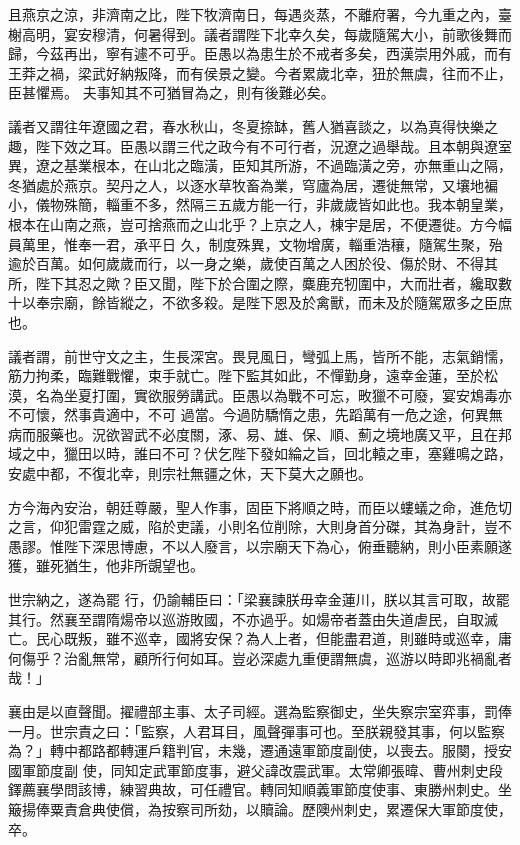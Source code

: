 \begin{pinyinscope}
 且燕京之涼，非濟南之比，陛下牧濟南日，每遇炎蒸，不離府署，今九重之內，臺榭高明，宴安穆清，何暑得到。議者謂陛下北幸久矣，每歲隨駕大小，前歌後舞而歸，今茲再出，寧有遽不可乎。臣愚以為患生於不戒者多矣，西漢崇用外戚，而有王莽之禍，梁武好納叛降，而有侯景之變。今者累歲北幸，狃於無虞，往而不止，臣甚懼焉。
 夫事知其不可猶冒為之，則有後難必矣。



 議者又謂往年遼國之君，春水秋山，冬夏捺缽，舊人猶喜談之，以為真得快樂之趣，陛下效之耳。臣愚以謂三代之政今有不可行者，況遼之過舉哉。且本朝與遼室異，遼之基業根本，在山北之臨潢，臣知其所游，不過臨潢之旁，亦無重山之隔，冬猶處於燕京。契丹之人，以逐水草牧畜為業，穹廬為居，遷徙無常，又壤地褊小，儀物殊簡，輜重不多，然隔三五歲方能一行，非歲歲皆如此也。我本朝皇業，根本在山南之燕，豈可捨燕而之山北乎？上京之人，棟宇是居，不便遷徙。方今幅員萬里，惟奉一君，承平日
 久，制度殊異，文物增廣，輜重浩穰，隨駕生聚，殆逾於百萬。如何歲歲而行，以一身之樂，歲使百萬之人困於役、傷於財、不得其所，陛下其忍之歟？臣又聞，陛下於合圍之際，麋鹿充牣圍中，大而壯者，纔取數十以奉宗廟，餘皆縱之，不欲多殺。是陛下恩及於禽獸，而未及於隨駕眾多之臣庶也。



 議者謂，前世守文之主，生長深宮。畏見風日，彎弧上馬，皆所不能，志氣銷懦，筋力拘柔，臨難戰懼，束手就亡。陛下監其如此，不憚勤身，遠幸金蓮，至於松漠，名為坐夏打圍，實欲服勞講武。臣愚以為戰不可忘，畋獵不可廢，宴安鴆毒亦不可懷，然事貴適中，不可
 過當。今過防驕惰之患，先蹈萬有一危之途，何異無病而服藥也。況欲習武不必度關，涿、易、雄、保、順、薊之境地廣又平，且在邦域之中，獵田以時，誰曰不可？伏乞陛下發如綸之旨，回北轅之車，塞雞鳴之路，安處中都，不復北幸，則宗社無疆之休，天下莫大之願也。



 方今海內安治，朝廷尊嚴，聖人作事，固臣下將順之時，而臣以螻蟻之命，進危切之言，仰犯雷霆之威，陷於吏議，小則名位削除，大則身首分磔，其為身計，豈不愚謬。惟陛下深思博慮，不以人廢言，以宗廟天下為心，俯垂聽納，則小臣素願遂獲，雖死猶生，他非所覬望也。



 世宗納之，遂為罷
 行，仍諭輔臣曰：「梁襄諫朕毋幸金蓮川，朕以其言可取，故罷其行。然襄至謂隋煬帝以巡游敗國，不亦過乎。如煬帝者蓋由失道虐民，自取滅亡。民心既叛，雖不巡幸，國將安保？為人上者，但能盡君道，則雖時或巡幸，庸何傷乎？治亂無常，顧所行何如耳。豈必深處九重便謂無虞，巡游以時即兆禍亂者哉！」



 襄由是以直聲聞。擢禮部主事、太子司經。選為監察御史，坐失察宗室弈事，罰俸一月。世宗責之曰：「監察，人君耳目，風聲彈事可也。至朕親發其事，何以監察為？」轉中都路都轉運戶籍判官，未幾，遷通遠軍節度副使，以喪去。服闋，授安國軍節度副
 使，同知定武軍節度事，避父諱改震武軍。太常卿張暐、曹州刺史段鐸薦襄學問該博，練習典故，可任禮官。轉同知順義軍節度使事、東勝州刺史。坐簸揚俸粟責倉典使償，為按察司所劾，以贖論。歷隩州刺史，累遷保大軍節度使，卒。




\end{pinyinscope}
